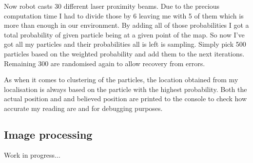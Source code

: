 \documentclass[a4paper]{article}
\begin{document}
Now robot casts 30 different laser proximity beams. Due to the precious computation time I had to divide those by 6 leaving me with 5 of them \textendash{} which is more than enough in our environment. By adding all of those probabilities I got a total probability of given particle being at a given point of the map. So now I've got all my particles and their probabilities \textendash{} all is left is sampling. Simply pick 500 particles based on the weighted probability and add them to the next iterations. Remaining 300 are randomised again to allow recovery from errors.

As when it comes to clustering of the particles, the location obtained from my localisation is always based on the particle with the highest probability. Both the actual position and and believed position are printed to the console to check how accurate my reading are and for debugging purposes.

\subsection{Image processing}
Work in progress...
\end{document}

